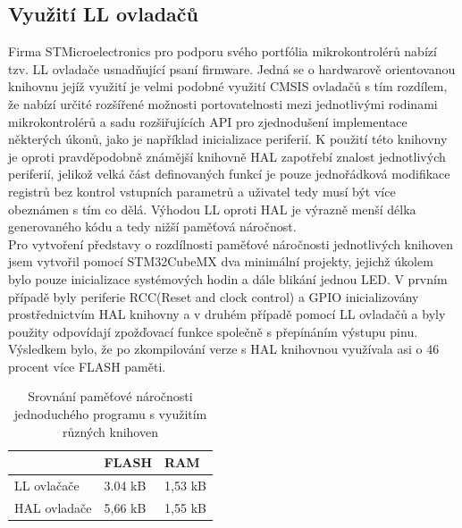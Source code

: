\subsection{Využití LL ovladačů}
Firma STMicroelectronics pro podporu svého portfólia mikrokontrolérů nabízí tzv. LL ovladače usnadňující psaní firmware. Jedná se o hardwarově orientovanou knihovnu jejíž využití je velmi podobné využití CMSIS ovladačů s tím rozdílem, že nabízí určité rozšířené možnosti portovatelnosti mezi jednotlivými rodinami mikrokontrolérů a sadu rozšiřujících API pro zjednodušení implementace některých úkonů, jako je například inicializace periferií. K použití této knihovny je oproti pravděpodobně známější knihovně HAL zapotřebí znalost jednotlivých periferií, jelikož velká část definovaných funkcí je pouze jednořádková modifikace registrů bez kontrol vstupních parametrů a uživatel tedy musí být více obeznámen s tím co dělá. Výhodou LL oproti HAL je výrazně menší délka generovaného kódu a tedy nižší paměťová náročnost.\\

Pro vytvoření představy o rozdílnosti paměťové náročnosti jednotlivých knihoven jsem vytvořil pomocí STM32CubeMX dva minimální projekty, jejichž úkolem bylo pouze inicializace systémových hodin a dále blikání jednou LED. V prvním případě byly periferie RCC(Reset and clock control) a GPIO inicializovány prostřednictvím HAL knihovny a v druhém případě pomocí LL ovladačů a byly použity odpovídají zpožďovací funkce společně s přepínáním výstupu pinu. Výsledkem bylo, že  po zkompilování verze s HAL knihovnou využívala asi o 46 procent více FLASH paměti.

\begin{table}[H]
	\begin{tabular}{l|ll}
		& FLASH   & RAM     \\ \hline
		LL ovlačače                       & 3.04 kB & 1,53 kB \\
		\multicolumn{1}{c|}{HAL ovladače} & 5,66 kB & 1,55 kB
	\end{tabular}
	\caption{Srovnání paměťové náročnosti jednoduchého programu s využitím různých knihoven}
	\label{tab:LL_HAL_MemoryUsage}
\end{table}	

